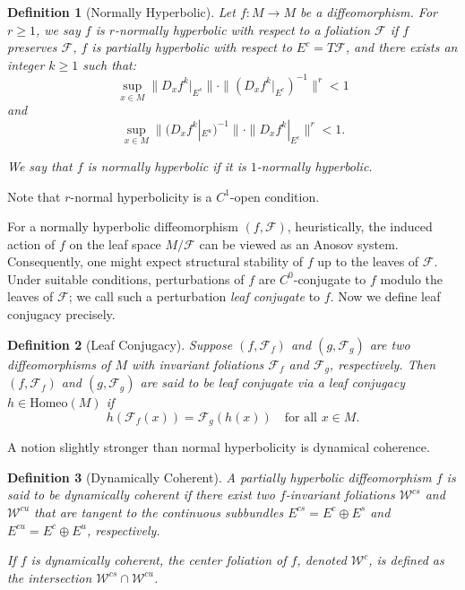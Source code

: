 \documentclass[11pt]{amsart}
\numberwithin{equation}{section}
\theoremstyle{plain}
\newtheorem{defi}{Definition}[section]
\begin{document}
\begin{defi}[Normally Hyperbolic]
Let $f:M\to M$ be a diffeomorphism. For $r\ge 1$, we say $f$ is \emph{$r$-normally hyperbolic} with respect to a foliation $\mathcal{F}$ if $f$ preserves $\mathcal{F}$, $f$ is partially hyperbolic with respect to $E^c=T\mathcal{F}$, and there exists an integer $k \ge 1$ such that: 
$$
\sup_{x\in M}\|D_xf^k|_{E^s}\|\cdot \|(D_xf^k|_{E^c})^{-1}\|^r<1
$$
and
$$
\sup_{x\in M}\|(D_xf^k|_{E^u})^{-1}\|\cdot \|D_xf^{k}|_{E^c}\|^r<1.
$$

We say that $f$ is \emph{normally hyperbolic} if it is $1$-normally hyperbolic.
\end{defi}

Note that $r$-normal hyperbolicity is a $C^1$-open condition.

For a normally hyperbolic diffeomorphism $(f,\mathcal{F})$, heuristically, the induced action of $f$ on the leaf space $M/\mathcal{F}$ can be viewed as an Anosov system. Consequently, one might expect structural stability of $f$ up to the leaves of $\mathcal{F}$. Under suitable conditions, perturbations of $f$ are $C^0$-conjugate to $f$ modulo the leaves of $\mathcal{F}$; we call such a perturbation \emph{leaf conjugate} to $f$. Now we define leaf conjugacy precisely.

\begin{defi}[Leaf Conjugacy]
Suppose $(f,\mathcal{F}_f)$ and $(g,\mathcal{F}_g)$ are two diffeomorphisms of $M$ with invariant foliations $\mathcal{F}_f$ and $\mathcal{F}_g$, respectively. Then $(f,\mathcal{F}_f)$ and $(g,\mathcal{F}_g)$ are said to be \emph{leaf conjugate} via a leaf conjugacy $h\in \mathrm{Homeo}(M)$ if
$$
h(\mathcal{F}_f(x))=\mathcal{F}_g(h(x)) \quad \text{for all } x\in M.
$$
\end{defi}

A notion slightly stronger than normal hyperbolicity is dynamical coherence.

\begin{defi}[Dynamically Coherent]
A partially hyperbolic diffeomorphism $f$ is said to be \emph{dynamically coherent} if there exist two $f$-invariant foliations $\mathcal{W}^{cs}$ and $\mathcal{W}^{cu}$ that are tangent to the continuous subbundles $E^{cs}=E^c\oplus E^s$ and $E^{cu}=E^c\oplus E^u$, respectively.

If $f$ is dynamically coherent, the center foliation of $f$, denoted $\mathcal{W}^c$, is defined as the intersection $\mathcal{W}^{cs}\cap \mathcal{W}^{cu}$.
\end{defi}
\end{document}
